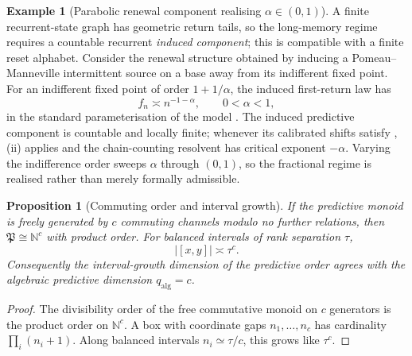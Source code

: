 \documentclass[11pt]{article}
\newtheorem{proposition}[theorem]{Proposition}
\theoremstyle{definition}
\newtheorem{example}[theorem]{Example}
\theoremstyle{remark}
\newcommand{\N}{\mathbb{N}}
\newcommand{\Pp}{\mathfrak{P}}
\newcommand{\qalg}{q_{\mathrm{alg}}}
\begin{document}
\begin{example}[Parabolic renewal component realising $\alpha\in(0,1)$]
\label{ex:parabolic-renewal}
A finite recurrent-state graph has geometric return tails, so the long-memory
regime requires a countable recurrent \emph{induced component}; this is
compatible with a finite reset alphabet.  Consider the renewal structure
obtained by inducing a Pomeau--Manneville intermittent source
\cite{pomeaumanneville1980} on a base away from its indifferent fixed point.
For an indifferent fixed point of order $1+1/\alpha$, the induced
first-return law has
\[
  f_n\asymp n^{-1-\alpha},\qquad 0<\alpha<1,
\]
in the standard parameterisation of the model
\cite{aaronson1997,sarig2001}.  The induced predictive component is countable
and locally finite; whenever its calibrated shifts satisfy
, \textup{(ii)} applies and the
chain-counting resolvent has critical exponent $-\alpha$.  Varying the
indifference order sweeps $\alpha$ through $(0,1)$, so the fractional regime is
realised rather than merely formally admissible.
\end{example}


\begin{proposition}[Commuting order and interval growth]
\label{prop:commuting-order}
If the predictive monoid is freely generated by $c$ commuting channels modulo no further relations, then $\Pp\cong\N^c$ with product order.  For balanced intervals of rank separation $\tau$,
\[
 |[x,y]|\asymp \tau^c.
\]
Consequently the interval-growth dimension of the predictive order agrees with the algebraic predictive dimension $\qalg=c$.
\end{proposition}

\begin{proof}
The divisibility order of the free commutative monoid on $c$ generators is the product order on $\N^c$.  A box with coordinate gaps $n_1,\ldots,n_c$ has cardinality $\prod_i(n_i+1)$.  Along balanced intervals $n_i\simeq\tau/c$, this grows like $\tau^c$.
\end{proof}
\end{document}
